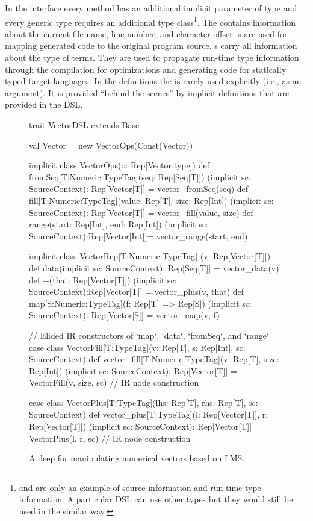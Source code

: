 In the  interface every method has an additional implicit
parameter of type  and every generic type requires an
additional  type class\footnote{ and  are only an example of source information and run-time type information. A particular DSL can use other types but they would still be used in the similar way.}. The  contains information about the current file name, line number, and character offset.
s are used for mapping generated code to the original
program source. s carry all information about the type of terms.
They are used to propagate run-time type information through the \edsl{}
compilation for optimizations and generating code for statically typed target
languages. In the \edsl definitions the  is rarely used
explicitly (i.e., as an argument). It is provided ``behind the scenes'' by implicit
definitions that are provided in the DSL.

\begin{figure}
\begin{listingtiny}


trait VectorDSL extends Base {
  val Vector = new VectorOps(Const(Vector))

  implicit class VectorOps(o: Rep[Vector.type]) {
    def fromSeq[T:Numeric:TypeTag](seq: Rep[Seq[T]])
      (implicit sc: SourceContext): Rep[Vector[T]] =
      vector_fromSeq(seq)
    def fill[T:Numeric:TypeTag](value: Rep[T], size: Rep[Int])
      (implicit sc: SourceContext): Rep[Vector[T]] =
      vector_fill(value, size)
    def range(start: Rep[Int], end: Rep[Int])
      (implicit sc: SourceContext):Rep[Vector[Int]]=
      vector_range(start, end)
  }

  implicit class VectorRep[T:Numeric:TypeTag]
    (v: Rep[Vector[T]]) {
    def data(implicit sc: SourceContext): Rep[Seq[T]] =
      vector_data(v)
    def +(that: Rep[Vector[T]])
      (implicit sc: SourceContext):Rep[Vector[T]] =
      vector_plus(v, that)
    def map[S:Numeric:TypeTag](f: Rep[T] => Rep[S])
      (implicit sc: SourceContext): Rep[Vector[S]] =
      vector_map(v, f)
  }

  // Elided IR constructors of `map`, `data`, `fromSeq`, and `range`
  case class VectorFill[T:TypeTag](v: Rep[T], s: Rep[Int],
    sc: SourceContext)
  def vector_fill[T:Numeric:TypeTag](v: Rep[T], size: Rep[Int])
    (implicit sc: SourceContext): Rep[Vector[T]] =
    VectorFill(v, size, sc) // IR node construction

  case class VectorPlus[T:TypeTag](lhs: Rep[T], rhs: Rep[T],
    sc: SourceContext)
  def vector_plus[T:TypeTag](l: Rep[Vector[T]], r: Rep[Vector[T]])
    (implicit sc: SourceContext): Rep[Vector[T]] =
    VectorPlus(l, r, sc) // IR node construction
}
\end{listingtiny}
\caption{\label{lst:vector_deep} A deep \edsl{} for manipulating numerical vectors based on LMS.}
\end{figure}

